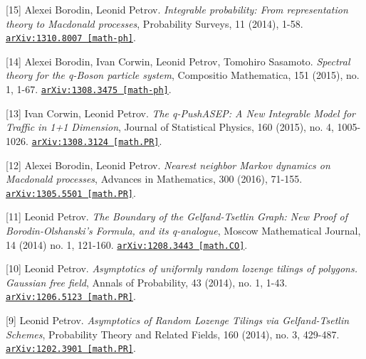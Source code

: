 \begin{etaremune}
\item[{[15]}] 
Alexei Borodin, Leonid Petrov.
\emph{Integrable probability: From representation theory to Macdonald processes}, Probability Surveys, 11 (2014), 1-58. 
\href{https://arxiv.org/abs/1310.8007}{\texttt{arXiv:1310.8007 [math-ph]}}.





\item[{[14]}] 
Alexei Borodin, Ivan Corwin, Leonid Petrov, Tomohiro Sasamoto.
\emph{Spectral theory for the q-Boson particle system}, Compositio Mathematica, 151 (2015), no. 1, 1-67. 
\href{https://arxiv.org/abs/1308.3475}{\texttt{arXiv:1308.3475 [math-ph]}}.



\item[{[13]}] 
Ivan Corwin, Leonid Petrov.
\emph{The q-PushASEP: A New Integrable Model for Traffic in 1+1 Dimension}, Journal of Statistical Physics, 160 (2015), no. 4, 1005-1026. 
\href{https://arxiv.org/abs/1308.3124}{\texttt{arXiv:1308.3124 [math.PR]}}.





\item[{[12]}] 
Alexei Borodin, Leonid Petrov.
\emph{Nearest neighbor Markov dynamics on Macdonald processes}, Advances in Mathematics, 300 (2016), 71-155. 
\href{https://arxiv.org/abs/1305.5501}{\texttt{arXiv:1305.5501 [math.PR]}}.









\item[{[11]}] 
Leonid Petrov.
\emph{The Boundary of the Gelfand-Tsetlin Graph: New Proof of Borodin-Olshanski's Formula, and its q-analogue}, Moscow Mathematical Journal, 14 (2014) no. 1, 121-160. 
\href{https://arxiv.org/abs/1208.3443}{\texttt{arXiv:1208.3443 [math.CO]}}.



\item[{[10]}] 
Leonid Petrov.
\emph{Asymptotics of uniformly random lozenge tilings of polygons. Gaussian free field}, Annals of Probability, 43 (2014), no. 1, 1-43. 
\href{https://arxiv.org/abs/1206.5123}{\texttt{arXiv:1206.5123 [math.PR]}}.





\item[{[9]}] 
Leonid Petrov.
\emph{Asymptotics of Random Lozenge Tilings via Gelfand-Tsetlin Schemes}, Probability Theory and Related Fields, 160 (2014), no. 3, 429-487. 
\href{https://arxiv.org/abs/1202.3901}{\texttt{arXiv:1202.3901 [math.PR]}}.








\end{etaremune}
